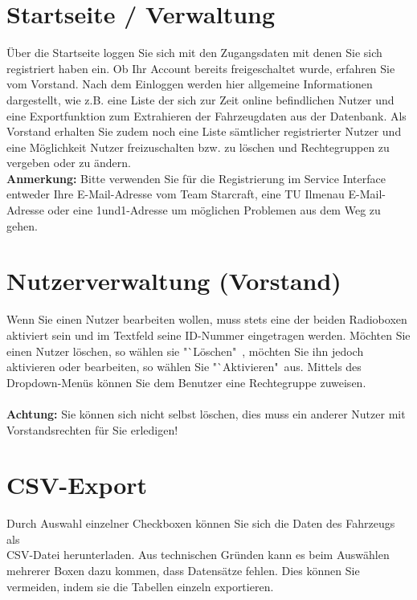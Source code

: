 \documentclass[fontsize = 12pt, paper = a4]{scrreprt}
\begin{document}
\section{Startseite / Verwaltung}

Über die Startseite loggen Sie sich mit den Zugangsdaten mit denen Sie sich registriert haben ein. 
Ob Ihr Account bereits freigeschaltet wurde, erfahren Sie vom Vorstand. 
Nach dem Einloggen werden hier allgemeine Informationen dargestellt, wie z.B. eine Liste der sich zur Zeit online befindlichen Nutzer und eine Exportfunktion zum Extrahieren der Fahrzeugdaten aus der Datenbank. 
Als Vorstand erhalten Sie zudem noch eine Liste sämtlicher registrierter Nutzer und eine Möglichkeit Nutzer freizuschalten bzw. zu löschen und Rechtegruppen zu vergeben oder zu ändern. \\

\textbf{Anmerkung:} Bitte verwenden Sie für die Registrierung im Service Interface entweder Ihre E-Mail-Adresse vom Team Starcraft, eine TU Ilmenau E-Mail-Adresse oder eine 1und1-Adresse um möglichen Problemen aus dem Weg zu gehen.

\section{Nutzerverwaltung (Vorstand)}

Wenn Sie einen Nutzer bearbeiten wollen, muss stets eine der beiden Radioboxen aktiviert sein und im Textfeld seine ID-Nummer eingetragen werden. Möchten Sie einen Nutzer löschen, so wählen sie "`Löschen"\ , möchten Sie ihn jedoch aktivieren oder bearbeiten, so wählen Sie "`Aktivieren"\ aus. Mittels des Dropdown-Menüs können Sie dem Benutzer eine Rechtegruppe zuweisen. \\ \\
\textbf{Achtung:} Sie können sich nicht selbst löschen, dies muss ein anderer Nutzer mit Vorstandsrechten für Sie erledigen!

\section{CSV-Export}

Durch Auswahl einzelner Checkboxen können Sie sich die Daten des Fahrzeugs als \\ CSV-Datei herunterladen. Aus technischen Gründen kann es beim Auswählen mehrerer Boxen dazu kommen, dass Datensätze fehlen. Dies können Sie vermeiden, indem sie die Tabellen einzeln exportieren.
\end{document}
